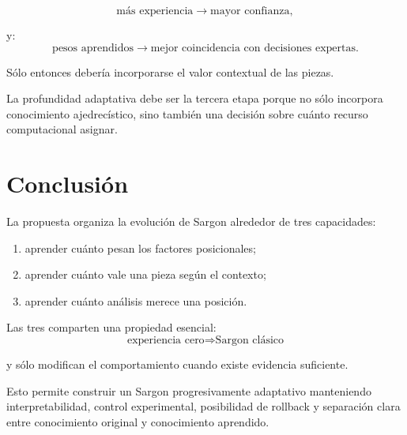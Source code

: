 \documentclass[11pt,a4paper]{article}
\begin{document}
\[
\text{más experiencia}
\rightarrow
\text{mayor confianza},
\]

y:
\[
\text{pesos aprendidos}
\rightarrow
\text{mejor coincidencia con decisiones expertas}.
\]

Sólo entonces debería incorporarse el valor contextual de las piezas.

La profundidad adaptativa debe ser la tercera etapa porque no sólo incorpora conocimiento ajedrecístico, sino también una decisión sobre cuánto recurso computacional asignar.

\section{Conclusión}
La propuesta organiza la evolución de Sargon alrededor de tres capacidades:

\begin{enumerate}
    \item aprender cuánto pesan los factores posicionales;
    \item aprender cuánto vale una pieza según el contexto;
    \item aprender cuánto análisis merece una posición.
\end{enumerate}

Las tres comparten una propiedad esencial:
\[
\boxed{
\text{experiencia cero}
\Rightarrow
\text{Sargon clásico}
}
\]

y sólo modifican el comportamiento cuando existe evidencia suficiente.

Esto permite construir un Sargon progresivamente adaptativo manteniendo interpretabilidad, control experimental, posibilidad de rollback y separación clara entre conocimiento original y conocimiento aprendido.
\end{document}
